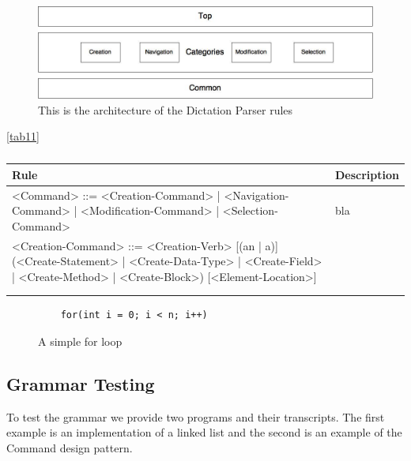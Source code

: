 \begin{figure}[H]
\centering
\includegraphics[scale=0.4]{./fig/BNFDiagram}
\caption{This is the architecture of the Dictation Parser rules}
\label{fig19}
\end{figure}
\autoref{tab11}
\begin{table}[H]
	\centering
	\label{my-label}
	\begin{tabular}{|p{10cm}|p{6cm}|}
		\hline
		\rowcolor[HTML]{9B9B9B} 
		{\color[HTML]{000000} Rule} & {\color[HTML]{000000} Description} \\ \hline
		<Command> ::= <Creation-Command> | <Navigation-Command> | <Modification-Command> | <Selection-Command>& bla \\ \hline
		<Creation-Command> ::= <Creation-Verb> [(an | a)] (<Create-Statement> | <Create-Data-Type> | <Create-Field> | <Create-Method> | <Create-Block>) [<Element-Location>]&     \\ \hline
		&     \\ \hline
		&     \\ \hline
	\end{tabular}
	\caption{}
	\label{tab11}
\end{table}

\begin{figure}[H]
	\begin{lstlisting}
	for(int i = 0; i < n; i++)
	\end{lstlisting}
	\caption{A simple for loop}
	\label{fig20}
\end{figure}

\subsection{Grammar Testing} \label{subsection: Grammar Testing}
To test the grammar we provide two programs and their transcripts. The first example is an implementation of a linked list and the second is an example of the Command design pattern. 

